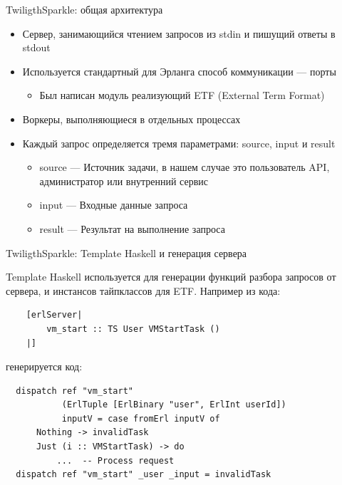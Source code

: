 \documentclass[10pt]{beamer}
\begin{document}
\begin{frame}{TwiligthSparkle: общая архитектура}
\begin{itemize}
  \item<1-> Сервер, занимающийся чтением запросов из stdin и пишущий ответы
  в stdout
  \item<1-> Используется стандартный для Эрланга способ коммуникации — порты
  \begin{itemize}
    \item Был написан модуль реализующий ETF (External Term Format)
  \end{itemize}
  \item<2-> Воркеры, выполняющиеся в отдельных процессах
  \item<3-> Каждый запрос определяется тремя параметрами: source, input и result
  \begin{itemize}
    \item source — Источник задачи, в нашем случае это пользователь API,
    администратор или внутренний сервис
    \item input — Входные данные запроса
    \item result — Результат на выполнение запроса
  \end{itemize}
\end{itemize}
\end{frame}

\begin{frame}[fragile]{TwiligthSparkle: Template Haskell и генерация сервера}

  Template Haskell используется для генерации функций разбора запросов
  от сервера, и инстансов тайпклассов для ETF. Например из кода:

  \begin{verbatim}
    [erlServer|
        vm_start :: TS User VMStartTask ()
    |]
  \end{verbatim}

генерируется код:

  \begin{verbatim}
  dispatch ref "vm_start"
           (ErlTuple [ErlBinary "user", ErlInt userId])
           inputV = case fromErl inputV of
      Nothing -> invalidTask
      Just (i :: VMStartTask) -> do
          ...  -- Process request
  dispatch ref "vm_start" _user _input = invalidTask
\end{verbatim}
\end{frame}
\end{document}
